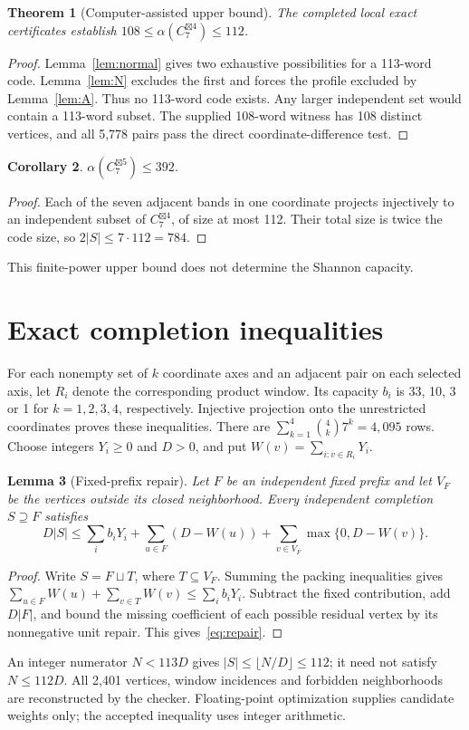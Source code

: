 \documentclass[11pt]{article}
\newtheorem{theorem}{Theorem}[section]
\newtheorem{lemma}[theorem]{Lemma}
\newtheorem{corollary}[theorem]{Corollary}
\theoremstyle{definition}
\newcommand{\G}[1]{C_7^{\boxtimes #1}}
\begin{document}
\begin{theorem}[Computer-assisted upper bound]\label{thm:112}
The completed local exact certificates establish
$108\leq\alpha(\G4)\leq112$.
\end{theorem}
\begin{proof}
Lemma~\ref{lem:normal} gives two exhaustive possibilities for a 113-word
code. Lemma~\ref{lem:N} excludes the first and forces the profile
excluded by Lemma~\ref{lem:A}. Thus no 113-word code exists. Any larger
independent set would contain a 113-word subset. The supplied 108-word
witness has 108 distinct vertices, and all 5,778 pairs pass the direct
coordinate-difference test.
\end{proof}

\begin{corollary}
$\alpha(\G5)\leq392$.
\end{corollary}
\begin{proof}
Each of the seven adjacent bands in one coordinate projects injectively
to an independent subset of $\G4$, of size at most 112. Their total size
is twice the code size, so $2|S|\leq7\cdot112=784$.
\end{proof}
This finite-power upper bound does not determine the Shannon capacity.

\section{Exact completion inequalities}\label{sec:dual}
For each nonempty set of $k$ coordinate axes and an adjacent pair on
each selected axis, let $R_i$ denote the corresponding product window.
Its capacity $b_i$ is 33, 10, 3 or 1 for $k=1,2,3,4$, respectively.
Injective projection onto the unrestricted coordinates proves these
inequalities. There are $\sum_{k=1}^4\binom4k7^k=4,095$ rows.
Choose integers $Y_i\geq0$ and $D>0$, and put
$W(v)=\sum_{i:v\in R_i}Y_i$.

\begin{lemma}[Fixed-prefix repair]\label{lem:repair}
Let $F$ be an independent fixed prefix and let $V_F$ be the vertices
outside its closed neighborhood. Every independent completion $S\supseteq F$
satisfies
\begin{equation}\label{eq:repair}
 D|S|\leq\sum_i b_iY_i+\sum_{u\in F}(D-W(u))
              +\sum_{v\in V_F}\max\{0,D-W(v)\}.
\end{equation}
\end{lemma}
\begin{proof}
Write $S=F\sqcup T$, where $T\subseteq V_F$.
Summing the packing inequalities gives
$\sum_{u\in F}W(u)+\sum_{v\in T}W(v)\leq\sum_i b_iY_i$.
Subtract the fixed contribution, add $D|F|$, and bound the missing
coefficient of each possible residual vertex by its nonnegative unit
repair. This gives~\eqref{eq:repair}.
\end{proof}
An integer numerator $N<113D$ gives $|S|\leq\lfloor N/D\rfloor\leq112$; it need not satisfy $N\leq112D$.
All 2,401 vertices, window incidences and forbidden neighborhoods are
reconstructed by the checker. Floating-point optimization supplies candidate
weights only; the accepted inequality uses integer arithmetic.
\end{document}
